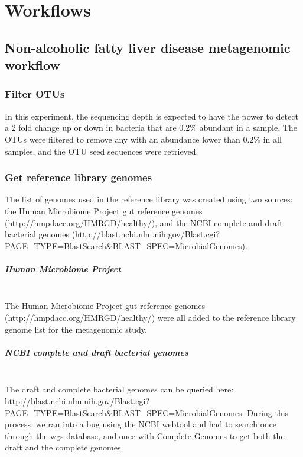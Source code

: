 \chapter{Workflows}\label{AppA}
\section{Non-alcoholic fatty liver disease metagenomic workflow}

\subsection{Filter OTUs}
In this experiment, the sequencing depth is expected to have the power to detect a 2 fold change up or down in bacteria that are 0.2\% abundant in a sample. The OTUs were filtered to remove any with an abundance lower than 0.2\% in all samples, and the OTU seed sequences were retrieved.

\subsection{Get reference library genomes}
The list of genomes used in the reference library was created using two sources: the Human Microbiome Project gut reference genomes (http://hmpdacc.org/HMRGD/healthy/), and the NCBI complete and draft bacterial genomes (http://blast.ncbi.nlm.nih.gov/Blast.cgi?PAGE_TYPE=BlastSearch&BLAST_SPEC=MicrobialGenomes).

\paragraph{Human Microbiome Project}\mbox{}\\
The Human Microbiome Project gut reference genomes (http://hmpdacc.org/HMRGD/healthy/) were all added to the reference library genome list for the metagenomic study.

\paragraph{NCBI complete and draft bacterial genomes}\mbox{}\\
The draft and complete bacterial genomes can be queried here: \url{http://blast.ncbi.nlm.nih.gov/Blast.cgi?PAGE_TYPE=BlastSearch&BLAST_SPEC=MicrobialGenomes}. During this process, we ran into a bug using the NCBI webtool and had to search once through the wgs database, and once with Complete Genomes to get both the draft and the complete genomes.

